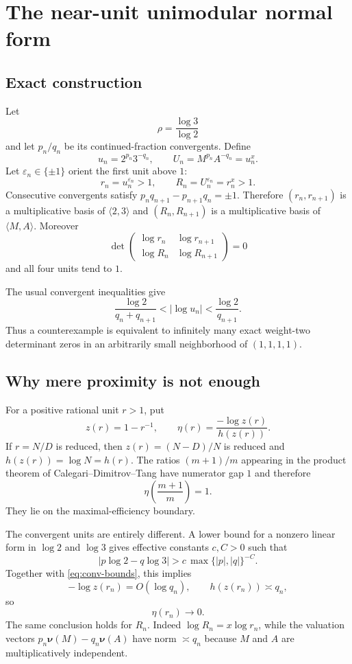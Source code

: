 \documentclass[11pt]{article}
\theoremstyle{definition}
\newcommand{\val}{\boldsymbol\nu}
\begin{document}
\section{The near-unit unimodular normal form}

\subsection{Exact construction}

Let
\[
  \rho=\frac{\log3}{\log2}
\]
and let $p_n/q_n$ be its continued-fraction convergents.  Define
\[
  u_n=2^{p_n}3^{-q_n},\qquad U_n=M^{p_n}A^{-q_n}=u_n^x.
\]
Let $\varepsilon_n\in\{\pm1\}$ orient the first unit above $1$:
\[
  r_n=u_n^{\varepsilon_n}>1,\qquad R_n=U_n^{\varepsilon_n}=r_n^x>1.
\]
Consecutive convergents satisfy
$p_nq_{n+1}-p_{n+1}q_n=\pm1$.  Therefore $(r_n,r_{n+1})$ is a multiplicative basis of
$\langle2,3\rangle$ and $(R_n,R_{n+1})$ is a multiplicative basis of
$\langle M,A\rangle$.  Moreover
\begin{equation}\label{eq:microdet}
 \det\begin{pmatrix}
  \log r_n&\log r_{n+1}\\
  \log R_n&\log R_{n+1}
 \end{pmatrix}=0
\end{equation}
and all four units tend to $1$.

The usual convergent inequalities give
\begin{equation}\label{eq:conv-bounds}
 \frac{\log2}{q_n+q_{n+1}}
 <|\log u_n|<\frac{\log2}{q_{n+1}}.
\end{equation}
Thus a counterexample is equivalent to infinitely many exact weight-two determinant zeros in
an arbitrarily small neighborhood of $(1,1,1,1)$.

\subsection{Why mere proximity is not enough}

For a positive rational unit $r>1$, put
\[
 z(r)=1-r^{-1},\qquad
 \eta(r)=\frac{-\log z(r)}{h(z(r))}.
\]
If $r=N/D$ is reduced, then $z(r)=(N-D)/N$ is reduced and
$h(z(r))=\log N=h(r)$.  The ratios $(m+1)/m$ appearing in the product theorem of
Calegari--Dimitrov--Tang have numerator gap $1$ and therefore
\[
 \eta\!\left(\frac{m+1}{m}\right)=1.
\]
They lie on the maximal-efficiency boundary.

The convergent units are entirely different.  A lower bound for a nonzero linear form in
$\log2$ and $\log3$ gives effective constants $c,C>0$ such that
\[
 |p\log2-q\log3|>c\,\max\{|p|,|q|\}^{-C}.
\]
Together with \eqref{eq:conv-bounds}, this implies
\[
 -\log z(r_n)=O(\log q_n),\qquad h(z(r_n))\asymp q_n,
\]
so
\begin{equation}\label{eq:eta-to-zero}
  \eta(r_n)\longrightarrow0.
\end{equation}
The same conclusion holds for $R_n$.  Indeed $\log R_n=x\log r_n$, while the valuation
vectors $p_n\val(M)-q_n\val(A)$ have norm $\asymp q_n$ because $M$ and $A$ are
multiplicatively independent.
\end{document}
